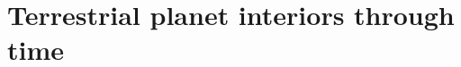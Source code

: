

















\section{Terrestrial planet interiors through time}
\label{sec:background-thermalhistory}

